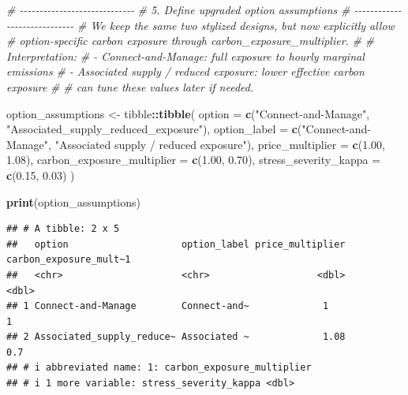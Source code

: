 \documentclass[
]{article}
\newenvironment{Shaded}{\begin{snugshade}}{\end{snugshade}}
\newcommand{\AttributeTok}[1]{\textcolor[rgb]{0.13,0.29,0.53}{#1}}
\newcommand{\CommentTok}[1]{\textcolor[rgb]{0.56,0.35,0.01}{\textit{#1}}}
\newcommand{\FloatTok}[1]{\textcolor[rgb]{0.00,0.00,0.81}{#1}}
\newcommand{\FunctionTok}[1]{\textcolor[rgb]{0.13,0.29,0.53}{\textbf{#1}}}
\newcommand{\NormalTok}[1]{#1}
\newcommand{\OtherTok}[1]{\textcolor[rgb]{0.56,0.35,0.01}{#1}}
\newcommand{\SpecialCharTok}[1]{\textcolor[rgb]{0.81,0.36,0.00}{\textbf{#1}}}
\newcommand{\StringTok}[1]{\textcolor[rgb]{0.31,0.60,0.02}{#1}}
\begin{document}
\begin{Shaded}
\begin{Highlighting}[]
\CommentTok{\# {-}{-}{-}{-}{-}{-}{-}{-}{-}{-}{-}{-}{-}{-}{-}{-}{-}{-}{-}{-}{-}{-}{-}{-}{-}{-}{-}{-}{-}}
\CommentTok{\# 5. Define upgraded option assumptions}
\CommentTok{\# {-}{-}{-}{-}{-}{-}{-}{-}{-}{-}{-}{-}{-}{-}{-}{-}{-}{-}{-}{-}{-}{-}{-}{-}{-}{-}{-}{-}{-}}
\CommentTok{\# We keep the same two stylized designs, but now explicitly allow}
\CommentTok{\# option{-}specific carbon exposure through carbon\_exposure\_multiplier.}
\CommentTok{\#}
\CommentTok{\# Interpretation:}
\CommentTok{\# {-} Connect{-}and{-}Manage: full exposure to hourly marginal emissions}
\CommentTok{\# {-} Associated supply / reduced exposure: lower effective carbon exposure}
\CommentTok{\#}
\CommentTok{\# can tune these values later if needed.}

\NormalTok{option\_assumptions }\OtherTok{\textless{}{-}}\NormalTok{ tibble}\SpecialCharTok{::}\FunctionTok{tibble}\NormalTok{(}
  \AttributeTok{option =} \FunctionTok{c}\NormalTok{(}\StringTok{"Connect{-}and{-}Manage"}\NormalTok{, }\StringTok{"Associated\_supply\_reduced\_exposure"}\NormalTok{),}
  \AttributeTok{option\_label =} \FunctionTok{c}\NormalTok{(}\StringTok{"Connect{-}and{-}Manage"}\NormalTok{, }\StringTok{"Associated supply / reduced exposure"}\NormalTok{),}
  \AttributeTok{price\_multiplier =} \FunctionTok{c}\NormalTok{(}\FloatTok{1.00}\NormalTok{, }\FloatTok{1.08}\NormalTok{),}
  \AttributeTok{carbon\_exposure\_multiplier =} \FunctionTok{c}\NormalTok{(}\FloatTok{1.00}\NormalTok{, }\FloatTok{0.70}\NormalTok{),}
  \AttributeTok{stress\_severity\_kappa =} \FunctionTok{c}\NormalTok{(}\FloatTok{0.15}\NormalTok{, }\FloatTok{0.03}\NormalTok{)}
\NormalTok{)}

\FunctionTok{print}\NormalTok{(option\_assumptions)}
\end{Highlighting}
\end{Shaded}

\begin{verbatim}
## # A tibble: 2 x 5
##   option                    option_label price_multiplier carbon_exposure_mult~1
##   <chr>                     <chr>                   <dbl>                  <dbl>
## 1 Connect-and-Manage        Connect-and~             1                       1  
## 2 Associated_supply_reduce~ Associated ~             1.08                    0.7
## # i abbreviated name: 1: carbon_exposure_multiplier
## # i 1 more variable: stress_severity_kappa <dbl>
\end{verbatim}
\end{document}
